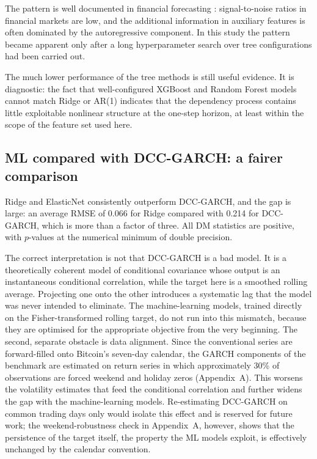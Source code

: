 The pattern is well documented in financial forecasting \cite{welch2008}: signal-to-noise ratios in financial markets are low, and the additional information in auxiliary features is often dominated by the autoregressive component. In this study the pattern became apparent only after a long hyperparameter search over tree configurations had been carried out.

The much lower performance of the tree methods is still useful evidence. It is diagnostic: the fact that well-configured XGBoost and Random Forest models cannot match Ridge or AR(1) indicates that the dependency process contains little exploitable nonlinear structure at the one-step horizon, at least within the scope of the feature set used here.

\subsection{ML compared with DCC-GARCH: a fairer comparison}

Ridge and ElasticNet consistently outperform DCC-GARCH, and the gap is large: an average RMSE of 0.066 for Ridge compared with 0.214 for DCC-GARCH, which is more than a factor of three. All DM statistics are positive, with $p$-values at the numerical minimum of double precision.

The correct interpretation is not that DCC-GARCH is a bad model. It is a theoretically coherent model of conditional covariance whose output is an instantaneous conditional correlation, while the target here is a smoothed rolling average. Projecting one onto the other introduces a systematic lag that the model was never intended to eliminate. The machine-learning models, trained directly on the Fisher-transformed rolling target, do not run into this mismatch, because they are optimised for the appropriate objective from the very beginning. The second, separate obstacle is data alignment. Since the conventional series are forward-filled onto Bitcoin's seven-day calendar, the GARCH components of the benchmark are estimated on return series in which approximately 30\% of observations are forced weekend and holiday zeros (Appendix~A). This worsens the volatility estimates that feed the conditional correlation and further widens the gap with the machine-learning models. Re-estimating DCC-GARCH on common trading days only would isolate this effect and is reserved for future work; the weekend-robustness check in Appendix~A, however, shows that the persistence of the target itself, the property the ML models exploit, is effectively unchanged by the calendar convention.

